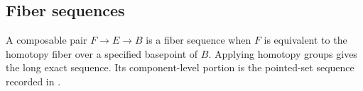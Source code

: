 \documentclass{amsart}
\begin{document}
\subsection{Fiber sequences}\label{fiber-sequences}

A composable pair \(F\to E\to B\) is a fiber sequence when \(F\) is
equivalent to the homotopy fiber over a specified basepoint of \(B\).
Applying homotopy groups gives the long exact sequence. Its
component-level portion is the pointed-set sequence recorded in
\textcite{sec-pi0-fiber}.

\clearpage
 \printbibliography
\end{document}
